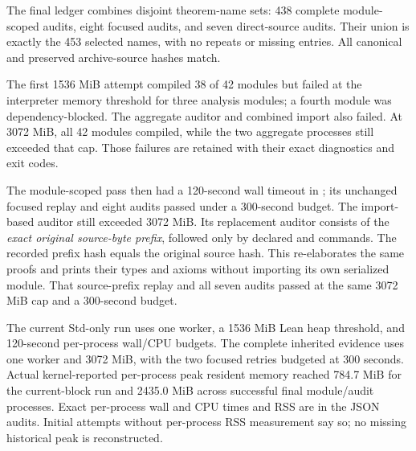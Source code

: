The final ledger combines disjoint theorem-name sets: 438 complete module-scoped audits, eight focused  audits, and seven direct-source  audits. Their union is exactly the 453 selected names, with no repeats or missing entries. All canonical and preserved archive-source hashes match.

The first 1536 MiB attempt compiled 38 of 42 modules but failed at the interpreter memory threshold for three analysis modules; a fourth module was dependency-blocked. The aggregate auditor and combined import also failed. At 3072 MiB, all 42 modules compiled, while the two aggregate processes still exceeded that cap. Those failures are retained with their exact diagnostics and exit codes.

The module-scoped pass then had a 120-second wall timeout in ; its unchanged focused replay and eight audits passed under a 300-second budget. The import-based  auditor still exceeded 3072 MiB. Its replacement auditor consists of the \emph{exact original source-byte prefix}, followed only by declared  and  commands. The recorded prefix hash equals the original source hash. This re-elaborates the same proofs and prints their types and axioms without importing its own serialized module. That source-prefix replay and all seven audits passed at the same 3072 MiB cap and a 300-second budget.

The current Std-only run uses one worker, a 1536 MiB Lean heap threshold, and 120-second per-process wall/CPU budgets. The complete inherited evidence uses one worker and 3072 MiB, with the two focused retries budgeted at 300 seconds. Actual kernel-reported per-process peak resident memory reached 784.7 MiB for the current-block run and 2435.0 MiB across successful final module/audit processes. Exact per-process wall and CPU times and RSS are in the JSON audits. Initial attempts without per-process RSS measurement say so; no missing historical peak is reconstructed.
